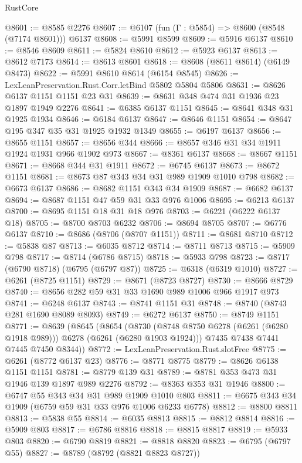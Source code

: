 \begin{lexlean}{RustCore}
\begin{coremodule}
@8601 := @8585 @2276
@8607 := @6107 (fun (Γ : @5854) => @8600 (@8548 (@7174 @8601))) @6137
@8608 := @5991 @8599
@8609 := @5916 @6137
@8610 := @8546 @8609
@8611 := @5824 @8610
@8612 := @5923 @6137
@8613 := @8612 @7173
@8614 := @8613 @8601
@8618 := @8608 (@8611 @8614) (@6149 @8473)
@8622 := @5991 @8610 @8614 (@6154 @8545)
@8626 := LexLeanPreservation.Rust.Corr.letBind @5802 @5804 @5806
@8631 := @8626 @6137 @1151 @1151 @23 @31
@8639 := @8631 @348 @474 @31 @1936 @23 @1897 @1949 @2276
@8641 := @6385 @6137 @1151
@8645 := @8641 @348 @31 @1925 @1934
@8646 := @6184 @6137
@8647 := @8646 @1151
@8654 := @8647 @195 @347 @35 @31 @1925 @1932 @1349
@8655 := @6197 @6137
@8656 := @8655 @1151
@8657 := @8656 @344
@8666 := @8657 @346 @31 @34 @1911 @1924 @1931 @966 @1902 @973
@8667 := @8361 @6137
@8668 := @8667 @1151
@8671 := @8668 @344 @31 @1911
@8672 := @6745 @6137
@8673 := @8672 @1151
@8681 := @8673 @87 @343 @34 @31 @989 @1909 @1010 @798
@8682 := @6673 @6137
@8686 := @8682 @1151 @343 @34 @1909
@8687 := @6682 @6137
@8694 := @8687 @1151 @47 @59 @31 @33 @976 @1006
@8695 := @6213 @6137
@8700 := @8695 @1151 @18 @31 @18 @976
@8703 := @6221 (@6222 @6137 @18)
@8705 := @8700 @8703 @6232
@8706 := @8694 @8705
@8707 := @6776 @6137
@8710 := @8686 (@8706 (@8707 @1151))
@8711 := @8681 @8710
@8712 := @5838 @87
@8713 := @6035 @8712
@8714 := @8711 @8713
@8715 := @5909 @798
@8717 := @8714 (@6786 @8715)
@8718 := @5933 @798
@8723 := @8717 (@6790 @8718) (@6795 (@6797 @87))
@8725 := @6318 (@6319 @1010)
@8727 := @6261 (@8725 @1151)
@8729 := @8671 (@8723 @8727)
@8730 := @8666 @8729
@8740 := @8656 @282 @59 @31 @33 @1690 @989 @1006 @966 @1917 @973
@8741 := @6248 @6137
@8743 := @8741 @1151 @31
@8748 := @8740 (@8743 @281 @1690 @8089 @8093)
@8749 := @6272 @6137
@8750 := @8749 @1151
@8771 := @8639
    (@8645
      (@8654
        (@8730 (@8748 @8750 @6278 (@6261 (@6280 @1918 @989))) @6278 (@6261 (@6280 @1903 @1924)))
        @7435
        @7438
        @7441
        @7445
        @7450
        @8344))
@8772 := LexLeanPreservation.Rust.slotFree
@8775 := @6261 (@8772 @6137 @23)
@8776 := @8771 @8775
@8779 := @8626 @6138 @1151 @1151
@8781 := @8779 @139 @31
@8789 := @8781 @353 @473 @31 @1946 @139 @1897 @989 @2276
@8792 := @8363 @353 @31 @1946
@8800 := @6747 @55 @343 @34 @31 @989 @1909 @1010 @803
@8811 := @6675 @343 @34 @1909 (@6759 @59 @31 @33 @976 @1006 @6233 @6778)
@8812 := @8800 @8811
@8813 := @5838 @55
@8814 := @6035 @8813
@8815 := @8812 @8814
@8816 := @5909 @803
@8817 := @6786 @8816
@8818 := @8815 @8817
@8819 := @5933 @803
@8820 := @6790 @8819
@8821 := @8818 @8820
@8823 := @6795 (@6797 @55)
@8827 := @8789 (@8792 (@8821 @8823 @8727))

\end{coremodule}
\end{lexlean}
